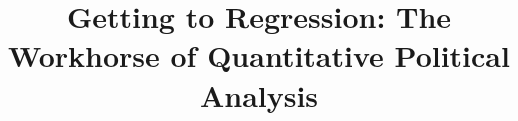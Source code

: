 
\usepackage{tikz}
\usetikzlibrary{shapes,arrows}

\title{Getting to Regression: The Workhorse of Quantitative Political Analysis}


\date[]{}



\frame{\titlepage}

\frame{\tableofcontents}



